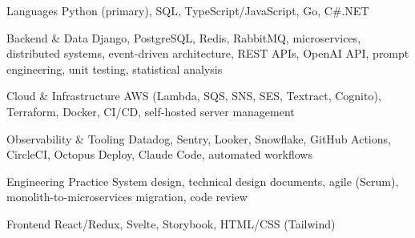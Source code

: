 \begin{cvskills}

  \cvskill
    {Languages}
    {Python (primary), SQL, TypeScript/JavaScript, Go, C\#.NET}

  \cvskill
    {Backend \& Data}
    {Django, PostgreSQL, Redis, RabbitMQ, microservices, distributed systems, event-driven architecture, REST APIs, OpenAI API, prompt engineering, unit testing, statistical analysis}

  \cvskill
    {Cloud \& Infrastructure}
    {AWS (Lambda, SQS, SNS, SES, Textract, Cognito), Terraform, Docker, CI/CD, self-hosted server management}

  \cvskill
    {Observability \& Tooling}
    {Datadog, Sentry, Looker, Snowflake, GitHub Actions, CircleCI, Octopus Deploy, Claude Code, automated workflows}

  \cvskill
    {Engineering Practice}
    {System design, technical design documents, agile (Scrum), monolith-to-microservices migration, code review}

  \cvskill
    {Frontend}
    {React/Redux, Svelte, Storybook, HTML/CSS (Tailwind)}

\end{cvskills}
